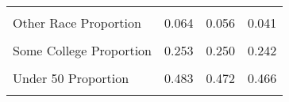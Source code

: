 \begin{table}[H]
\begin{tabular}[t]{lrrr}
\cellcolor{gray!6}{Not Married Proportion} & \cellcolor{gray!6}{0.368} & \cellcolor{gray!6}{0.396} & \cellcolor{gray!6}{0.373}\\
Other Race Proportion & 0.064 & 0.056 & 0.041\\
\addlinespace
\cellcolor{gray!6}{Over 50 Proportion} & \cellcolor{gray!6}{0.337} & \cellcolor{gray!6}{0.348} & \cellcolor{gray!6}{0.360}\\
Some College Proportion & 0.253 & 0.250 & 0.242\\
\cellcolor{gray!6}{Under 30 Proportion} & \cellcolor{gray!6}{0.180} & \cellcolor{gray!6}{0.180} & \cellcolor{gray!6}{0.175}\\
Under 50 Proportion & 0.483 & 0.472 & 0.466\\
\cellcolor{gray!6}{White Proportion} & \cellcolor{gray!6}{0.870} & \cellcolor{gray!6}{0.837} & \cellcolor{gray!6}{0.813}\\
\bottomrule
\end{tabular}
\end{table}
